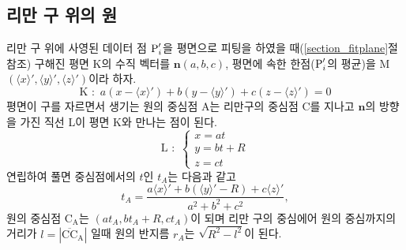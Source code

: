 \documentclass[chapter,a4paper,10pt]{oblivoir}
\begin{document}
\subsection{리만 구 위의 원}
리만 구 위에 사영된 데이터 점 $\textrm P_i'$을 평면으로 피팅을 하였을 때(\ref{section_fitplane}절 참조) 
구해진 평면 K의 수직 벡터를 $\mathbf{n}(a,b,c)$, 평면에 속한 한점($\textrm P_i'$의 평균)을 
M$(\langle x\rangle',\langle y\rangle',\langle z\rangle')$이라 하자.
\begin{equation}
\textrm{K} \,\,:\,\, a(x-\langle x\rangle') + b(y-\langle y\rangle') + c(z-\langle z\rangle') = 0
\end{equation}
평면이 구를 자르면서 생기는 원의 중심점 A는 리만구의 중심점 C를 지나고
$\mathbf{n}$의 방향을 가진 직선 L이 평면 K와 만나는 점이 된다.
\begin{equation}
\textrm{L} \,\,:\,\, 
\left\{
\begin{array}{ll}
x = at \\
y = bt + R\\
z = ct
\end{array}
\right.
\end{equation}
연립하여 풀면 중심점에서의 $t$인 $t_A$는 다음과 같고
\begin{equation}
t_A = \frac{a\langle x\rangle'+ b(\langle y\rangle'-R) + c\langle z\rangle'} {a^2 + b^2 + c^2},
\end{equation}
원의 중심점 $\textrm{C}_\textrm{A}$는 $(at_A, bt_A + R, ct_A)$이 되며
리만 구의 중심에어 원의 중심까지의 거리가 $l = |\overline{\textrm{CC}}_\textrm{A}|$ 일때
원의 반지름 $r_A$는 $\sqrt{R^2 - l^2}$이 된다.
\end{document}
